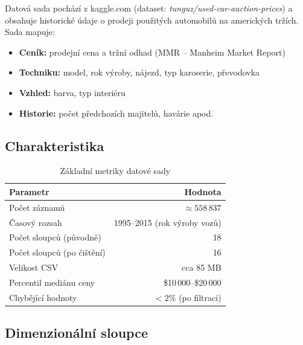 \documentclass[12pt,a4paper]{article}
\begin{document}
Datová sada pochází z kaggle.com (dataset: \textit{tunguz/used-car-auction-prices}) a obsahuje
historické údaje o prodeji použitých automobilů na amerických tržích. Sada mapuje:

\begin{itemize}
    \item \textbf{Ceník:} prodejní cena a tržní odhad (MMR – Manheim Market Report)
    \item \textbf{Techniku:} model, rok výroby, nájezd, typ karoserie, převodovka
    \item \textbf{Vzhled:} barva, typ interiéru
    \item \textbf{Historie:} počet předchozích majitelů, havárie apod.
\end{itemize}

\subsection{Charakteristika}

\begin{table}[H]
    \centering
    \caption{Základní metriky datové sady}
    \begin{tabular}{|l|r|}
        \hline
        \textbf{Parametr} & \textbf{Hodnota} \\
        \hline
        Počet záznamů & $\approx 558\,837$ \\
        \hline
        Časový rozsah & 1995–2015 (rok výroby vozů) \\
        \hline
        Počet sloupců (původně) & 18 \\
        \hline
        Počet sloupců (po čištění) & 16 \\
        \hline
        Velikost CSV & cca 85 MB \\
        \hline
        Percentil mediánu ceny & \$10\,000–\$20\,000 \\
        \hline
        Chybějící hodnoty & $< 2\%$ (po filtraci) \\
        \hline
    \end{tabular}
\end{table}

\subsection{Dimenzionální sloupce}
\end{document}
